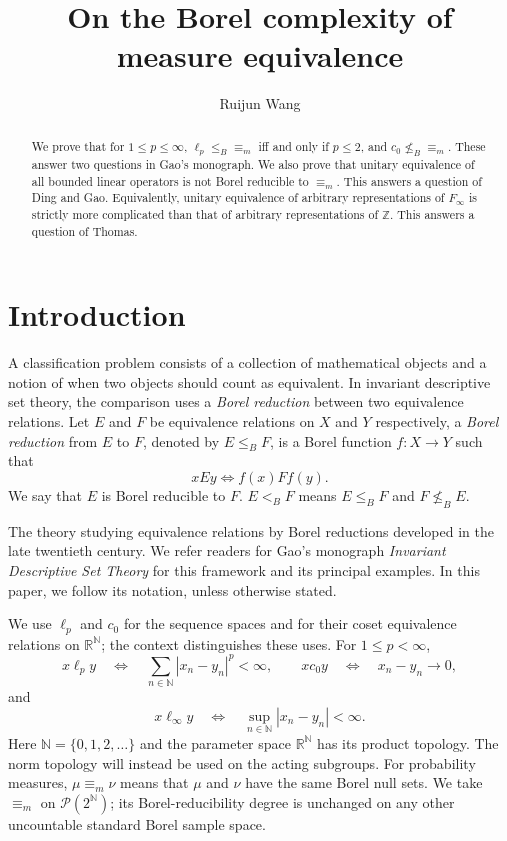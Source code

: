 \documentclass[11pt]{article}
\title{On the Borel complexity of measure equivalence}
\author{Ruijun Wang}
\date{}
\theoremstyle{definition}
\newcommand{\N}{\mathbb N}
\newcommand{\R}{\mathbb R}
\newcommand{\Prob}{\mathcal P}
\newcommand{\ME}{\mathrel{\equiv_m}}
\begin{document}
\maketitle
\begin{abstract}
We prove that for $1\leq p\leq\infty$, $\ell_p\leq_B{\equiv_m}$ iff and only if $p\leq2$, and $c_0\nleq_B{\equiv_m}$. These answer two questions in Gao's monograph. We also prove that unitary equivalence of all bounded linear operators is not Borel reducible to $\equiv_m$. This answers a question of Ding and Gao. Equivalently, unitary equivalence of arbitrary representations of $F_\infty$ is strictly more complicated than that of arbitrary representations of $\mathbb Z$. This answers a question of Thomas.
\end{abstract}
\tableofcontents

\section{Introduction}
A classification problem consists of a collection of mathematical objects
and a notion of when two objects should count as equivalent. In invariant descriptive set theory, the comparison uses a \emph{Borel reduction} between two equivalence relations. Let $E$ and $F$ be equivalence relations on $X$ and $Y$ respectively, a \emph{Borel reduction} from $E$ to $F$, denoted by $E\leq_B F$,  is a Borel function $f:X\to Y$ such that $$xEy\Longleftrightarrow f(x)Ff(y).$$ We say that $E$ is Borel reducible to $F$. $E<_B F$ means $E\leq_B F$ and $F\nleq_B E$.

The theory studying equivalence relations by Borel reductions developed
in the late twentieth century. We refer readers for Gao's monograph \emph{Invariant Descriptive Set Theory} \cite{Gao} for this framework and its principal examples. In this paper, we follow its notation, unless otherwise stated.

We use $\ell_p$ and $c_0$ for the sequence
spaces and for their coset equivalence relations on $\R^\N$; the context
distinguishes these uses. For $1\leq p<\infty$,
\[
 x\mathrel{\ell_p}y
 \quad\Longleftrightarrow\quad
 \sum_{n\in\N}|x_n-y_n|^p<\infty,
 \qquad
 x\mathrel{c_0}y
 \quad\Longleftrightarrow\quad x_n-y_n\longrightarrow0,
\]
and
\[
 x\mathrel{\ell_\infty}y
 \quad\Longleftrightarrow\quad
 \sup_{n\in\N}|x_n-y_n|<\infty.
\]
Here $\N=\{0,1,2,\ldots\}$ and the parameter space $\R^\N$ has its
product topology. The norm topology will instead be used on the acting
subgroups. For probability measures, $\mu\ME\nu$ means that $\mu$ and
$\nu$ have the same Borel null sets. We take $\equiv_m$ on
$\Prob(2^\N)$; its Borel-reducibility degree is unchanged on any other
uncountable standard Borel sample space.
\end{document}

